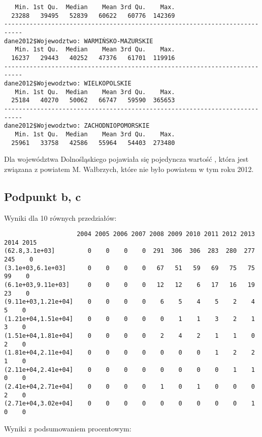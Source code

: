 \begin{verbatim}
   Min. 1st Qu.  Median    Mean 3rd Qu.    Max. 
  23288   39495   52839   60622   60776  142369 
--------------------------------------------------------------------------- 
dane2012$Wojewodztwo: WARMIŃSKO-MAZURSKIE
   Min. 1st Qu.  Median    Mean 3rd Qu.    Max. 
  16237   29443   40252   47376   61701  119916 
--------------------------------------------------------------------------- 
dane2012$Wojewodztwo: WIELKOPOLSKIE
   Min. 1st Qu.  Median    Mean 3rd Qu.    Max. 
  25184   40270   50062   66747   59590  365653 
--------------------------------------------------------------------------- 
dane2012$Wojewodztwo: ZACHODNIOPOMORSKIE
   Min. 1st Qu.  Median    Mean 3rd Qu.    Max. 
  25961   33758   42586   55964   54403  273480 

\end{verbatim}

Dla województwa Dolnośląskiego pojawiała się pojedyncza wartość , która
jest związana z powiatem M. Wałbrzych, które nie było powiatem w tym roku 2012.

\newpage
\subsection*{Podpunkt b, c}

Wyniki dla 10 równych przedziałów:

\begin{verbatim}
                    2004 2005 2006 2007 2008 2009 2010 2011 2012 2013 2014 2015
(62.8,3.1e+03]         0    0    0    0  291  306  306  283  280  277  245    0
(3.1e+03,6.1e+03]      0    0    0    0   67   51   59   69   75   75   99    0
(6.1e+03,9.11e+03]     0    0    0    0   12   12    6   17   16   19   23    0
(9.11e+03,1.21e+04]    0    0    0    0    6    5    4    5    2    4    5    0
(1.21e+04,1.51e+04]    0    0    0    0    0    1    1    3    2    1    3    0
(1.51e+04,1.81e+04]    0    0    0    0    2    4    2    1    1    0    2    0
(1.81e+04,2.11e+04]    0    0    0    0    0    0    0    1    2    2    1    0
(2.11e+04,2.41e+04]    0    0    0    0    0    0    0    0    1    1    0    0
(2.41e+04,2.71e+04]    0    0    0    0    1    0    1    0    0    0    2    0
(2.71e+04,3.02e+04]    0    0    0    0    0    0    0    0    0    1    0    0
\end{verbatim}

Wyniki z podsumowaniem procentowym:

